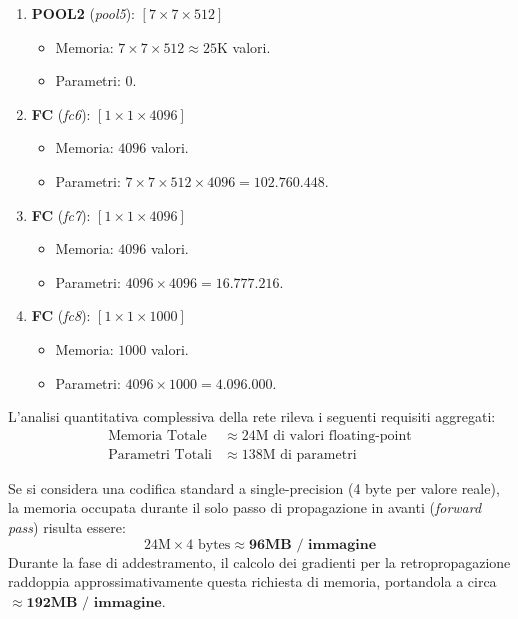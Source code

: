 ﻿\documentclass[11pt, a4paper]{article}
\begin{document}
\begin{enumerate}[noitemsep]
\begin{itemize}
        \item Parametri: $(3 \times 3 \times 512) \times 512 = 2.359.296$.
    \end{itemize}
    \item \textbf{POOL2} (\emph{pool5}): $[7 \times 7 \times 512]$
    \begin{itemize}
        \item Memoria: $7 \times 7 \times 512 \approx 25\text{K}$ valori.
        \item Parametri: $0$.
    \end{itemize}
    \item \textbf{FC} (\emph{fc6}): $[1 \times 1 \times 4096]$
    \begin{itemize}
        \item Memoria: $4096$ valori.
        \item Parametri: $7 \times 7 \times 512 \times 4096 = 102.760.448$.
    \end{itemize}
    \item \textbf{FC} (\emph{fc7}): $[1 \times 1 \times 4096]$
    \begin{itemize}
        \item Memoria: $4096$ valori.
        \item Parametri: $4096 \times 4096 = 16.777.216$.
    \end{itemize}
    \item \textbf{FC} (\emph{fc8}): $[1 \times 1 \times 1000]$
    \begin{itemize}
        \item Memoria: $1000$ valori.
        \item Parametri: $4096 \times 1000 = 4.096.000$.
    \end{itemize}
\end{enumerate}


L'analisi quantitativa complessiva della rete rileva i seguenti requisiti aggregati:
\begin{align*}
\text{Memoria Totale} &\approx 24\text{M di valori floating-point} \\
\text{Parametri Totali} &\approx 138\text{M di parametri}
\end{align*}

Se si considera una codifica standard a single-precision (4 byte per valore reale), la memoria occupata durante il solo passo di propagazione in avanti (\emph{forward pass}) risulta essere:
\[
24\text{M} \times 4 \text{ bytes} \approx \mathbf{96\text{MB / immagine}}
\]
Durante la fase di addestramento, il calcolo dei gradienti per la retropropagazione raddoppia approssimativamente questa richiesta di memoria, portandola a circa $\approx \mathbf{192\text{MB / immagine}}$.
\end{document}
